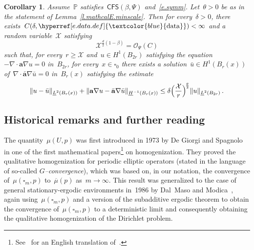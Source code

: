 \documentclass[11pt,twoside]{article} %
\let\oldsquare\square %
\renewcommand{\square}{\oldsquare}
\numberwithin{equation}{section}
\newtheorem{corollary}[theorem]{Corollary}
\theoremstyle{definition}
\newcommand{\dataref}{\hyperref[e.data.def]{\textcolor{blue}{\ensuremath{\mathrm{data}}}}}
\renewcommand{\a}{\mathbf{a}}
\newcommand{\ahom}{\bar{\a}}
\newcommand{\cu}{\square}
\renewcommand{\P}{\mathbb{P}}
\newcommand{\X}{\mathcal{X}}
\renewcommand{\O}{\mathcal{O}}
\newcommand{\CFS}{\mathsf{CFS}}
\begin{document}
\begin{corollary}
\label{c.quant.DP.interior}
Assume~$\P$ satisfies~$\CFS(\beta,\Psi)$ and~\eqref{e.symm}. 
Let~$\theta >0$ be as in the statement of Lemma~\ref{l.mathcalE.minscale}. Then for every~$\delta>0$, there exists~$C(\delta,\dataref)<\infty$ and a random variable~$\X$ satisfying 
\begin{equation}
\label{e.mmmbound2}
\X^{\frac d2 (1-\beta)}
= \O_\Psi(C)
\end{equation}
such that, for every~$r \geq \X$ and~$u \in H^1(B_{2r})$ satisfying the equation~$-\nabla \cdot\a\nabla u = 0$ in~$B_{2r}$, for every~$x \in \cu_0$ there exists a solution~$\bar{u} \in H^1(B_r(x))$ of~$\nabla \cdot \ahom\nabla \bar{u} = 0$ in~$B_r(x)$ satisfying the estimate
\begin{equation*}
\| u - \bar u \|_{\underline{L}^2(B_r(x))} 
+  
\|\a \nabla u - \ahom \nabla \bar u \|_{\underline{H}^{-1}(B_r(x))} 
\leq 
\delta \Bigl( \frac{\X}{r} \Bigr)^{\!\frac \theta2}
\| u \|_{\underline{L}^2(B_{2r})} 
\,.
\end{equation*}
\end{corollary}




\subsection*{Historical remarks and further reading}

The quantity~$\mu(U,p)$ was first introduced in 1973 by De Giorgi and Spagnolo~\cite{DGS} in one of the first mathematical papers\footnote{See~\cite[pp. 361--379]{DG} for an English translation of~\cite{DGS}.}
on homogenization. They proved the qualitative homogenization for periodic elliptic operators (stated in the language of so-called \emph{$G$--convergence}), which was based on, in our notation,  
the convergence of~$\mu(\cu_m,p)$ to~$\overline{\mu}(p)$ as~$m\to \infty$. 
This result was generalized to the case of general stationary-ergodic environments in~1986 by Dal~Maso and Modica~\cite{DM1,DM2}, again using~$\mu(\cu_m,p)$ and a version of the subadditive ergodic theorem to obtain the convergence of~$\mu(\cu_m,p)$ to a deterministic limit and consequently obtaining the qualitative homogenization of the Dirichlet problem. 

\smallskip
\end{document}
